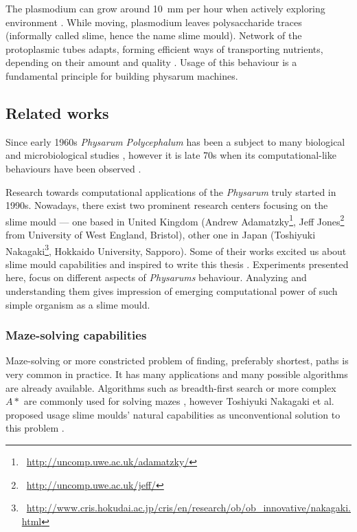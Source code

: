 The plasmodium can grow around 10~mm per hour when actively exploring environment \cite{coggin1996dynamic}. While moving, plasmodium leaves polysaccharide traces (informally called slime, hence the name slime mould). Network of the protoplasmic tubes adapts, forming efficient ways of transporting nutrients, depending on their amount and quality \cite{nakagaki2004obtaining}. Usage of this behaviour is a fundamental principle for building physarum machines.


\subsection{Related works}

Since early 1960s \textit{Physarum Polycephalum} has been a subject to many biological and microbiological studies \cite{guttes1964mitotic,daniel1962method}, however it is late 70s when its computational-like behaviours have been observed \cite{wohlfarth1979oscillatory}.

Research towards computational applications of the \textit{Physarum} truly started in 1990s. Nowadays, there exist two prominent research centers focusing on the slime mould --- one based in United Kingdom (Andrew Adamatzky\footnote{~\url{http://uncomp.uwe.ac.uk/adamatzky/}}, Jeff Jones\footnote{~\url{http://uncomp.uwe.ac.uk/jeff/}} from University of West England, Bristol), other one in Japan (Toshiyuki Nakagaki\footnote{~\url{http://www.cris.hokudai.ac.jp/cris/en/research/ob/ob\_innovative/nakagaki.html}}, Hokkaido University, Sapporo). Some of their works excited us about slime mould capabilities and inspired to write this thesis \cite{nakagaki2000intelligence,adamatzky2010physarum,jones2015pattern}. Experiments presented here, focus on different aspects of \textit{Physarums} behaviour. Analyzing and understanding them gives impression of emerging computational power of such simple organism as a slime mould.


\subsubsection{Maze-solving capabilities}

Maze-solving or more constricted problem of finding, preferably shortest, paths is very common in practice. It has many applications and many possible algorithms are already available. Algorithms such as breadth-first search or more complex $A*$ are commonly used for solving mazes \cite{zelkowitz1979principles}, however Toshiyuki Nakagaki et al. proposed usage slime moulds' natural capabilities as unconventional solution to this problem \cite{nakagaki2000intelligence}.

